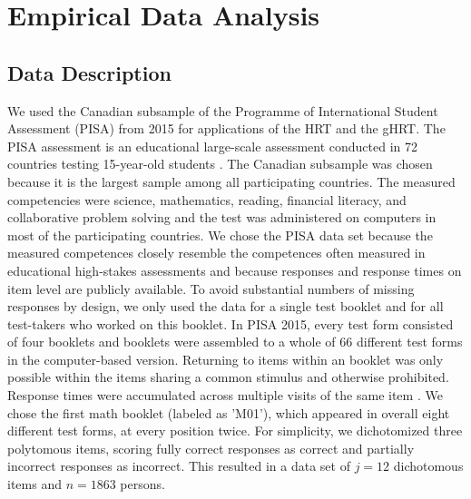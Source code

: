 \documentclass[a4paper,man,apacite,donotrepeattitle]{apa6}
\begin{document}
\section{Empirical Data Analysis}
\subsection{Data Description}
We used the Canadian subsample of the Programme of International Student Assessment (PISA) from 2015 for applications of the HRT and the gHRT. The PISA assessment is an educational large-scale assessment conducted in 72 countries testing 15-year-old students \cite{PISA.2015tech}. The Canadian subsample was chosen because it is the largest sample among all participating countries. The measured competencies were science, mathematics, reading, financial literacy, and collaborative problem solving and the test was administered on computers in most of the participating countries. We chose the PISA data set because the measured competences closely resemble the competences often measured in educational high-stakes assessments and because responses and response times on item level are publicly available. To avoid substantial numbers of missing responses by design, we only used the data for a single test booklet and for all test-takers who worked on this booklet. In PISA 2015, every test form consisted of four booklets and booklets were assembled to a whole of 66 different test forms in the computer-based version. Returning to items within an booklet was only possible within the items sharing a common stimulus and otherwise prohibited. Response times were accumulated across multiple visits of the same item \cite[pp. 45-47]{PISA.2015tech}. We chose the first math booklet (labeled as 'M01'), which appeared in overall eight different test forms, at every position twice. For simplicity, we dichotomized three polytomous items, scoring fully correct responses as correct and partially incorrect responses as incorrect. This resulted in a data set of $j = 12$ dichotomous items and $n = 1863$ persons.  
\end{document}
